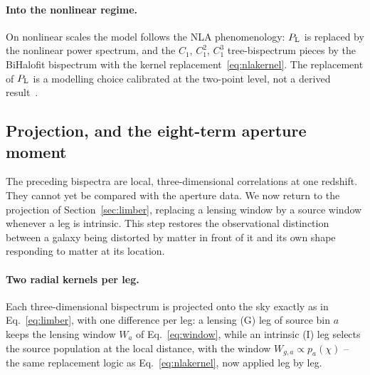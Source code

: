 \documentclass[11pt]{article}
\numberwithin{equation}{section}
\begin{document}
\paragraph{Into the nonlinear regime.}
On nonlinear scales the model follows the NLA phenomenology:
$P_{\rm L}$ is replaced by the nonlinear power spectrum, and the
$C_1$, $C_1^2$, $C_1^3$ tree-bispectrum pieces by the BiHalofit
bispectrum with the kernel replacement~\eqref{eq:nlakernel}.  The
replacement of $P_{\rm L}$ is a modelling choice calibrated at the
two-point level, not a derived result~\cite{GomesTATT}.

\subsection{Projection, and the eight-term aperture moment}
\label{sec:iatotal}

The preceding bispectra are local, three-dimensional correlations at one
redshift. They cannot yet be compared with the aperture data. We now
return to the projection of Section~\ref{sec:limber}, replacing a lensing
window by a source window whenever a leg is intrinsic. This step restores
the observational distinction between a galaxy being distorted by matter
in front of it and its own shape responding to matter at its location.

\paragraph{Two radial kernels per leg.}
Each three-dimensional bispectrum is projected onto the sky exactly
as in Eq.~\eqref{eq:limber}, with one difference per leg: a lensing
(G) leg of source bin $a$ keeps the lensing window
$W_a$ of Eq.~\eqref{eq:window}, while an intrinsic (I) leg selects
the source population at the local distance, with the window
$W_{g,a} \propto p_a(\chi)$ -- the same replacement logic as
Eq.~\eqref{eq:nlakernel}, now applied leg by leg.
\end{document}
